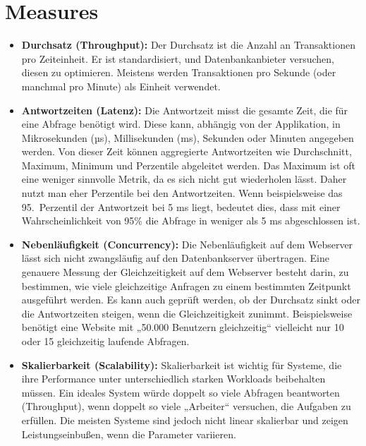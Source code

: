 \section{Measures}\label{sec:einleitung-measures}
\begin{itemize}[label={--}]
    \item \textbf{Durchsatz (Throughput):} Der Durchsatz ist die Anzahl an Transaktionen pro Zeiteinheit.
    Er ist standardisiert, und Datenbankanbieter versuchen, diesen zu optimieren.
    Meistens werden Transaktionen pro Sekunde (oder manchmal pro Minute) als Einheit verwendet.
    \item \textbf{Antwortzeiten (Latenz):} Die Antwortzeit misst die gesamte Zeit, die für eine Abfrage benötigt wird.
    Diese kann, abhängig von der Applikation, in Mikrosekunden (µs), Millisekunden (ms), Sekunden oder Minuten angegeben werden.
    Von dieser Zeit können aggregierte Antwortzeiten wie Durchschnitt, Maximum, Minimum und Perzentile abgeleitet werden.
    Das Maximum ist oft eine weniger sinnvolle Metrik, da es sich nicht gut wiederholen lässt.
    Daher nutzt man eher Perzentile bei den Antwortzeiten.
    Wenn beispielsweise das 95.\ Perzentil der Antwortzeit bei 5 ms liegt, bedeutet dies, dass mit einer Wahrscheinlichkeit von 95\% die Abfrage in weniger als 5 ms abgeschlossen ist.
    \item \textbf{Nebenläufigkeit (Concurrency):} Die Nebenläufigkeit auf dem Webserver lässt sich nicht zwangsläufig auf den Datenbankserver übertragen.
    Eine genauere Messung der Gleichzeitigkeit auf dem Webserver besteht darin, zu bestimmen, wie viele gleichzeitige Anfragen zu einem bestimmten Zeitpunkt ausgeführt werden.
    Es kann auch geprüft werden, ob der Durchsatz sinkt oder die Antwortzeiten steigen, wenn die Gleichzeitigkeit zunimmt.
    Beispielsweise benötigt eine Website mit „50.000 Benutzern gleichzeitig“ vielleicht nur 10 oder 15 gleichzeitig laufende Abfragen.
    \item \textbf{Skalierbarkeit (Scalability):} Skalierbarkeit ist wichtig für Systeme, die ihre Performance unter unterschiedlich starken Workloads beibehalten müssen.
    Ein ideales System würde doppelt so viele Abfragen beantworten (Throughput), wenn doppelt so viele „Arbeiter“ versuchen, die Aufgaben zu erfüllen.
    Die meisten Systeme sind jedoch nicht linear skalierbar und zeigen Leistungseinbußen, wenn die Parameter variieren.
\end{itemize}
